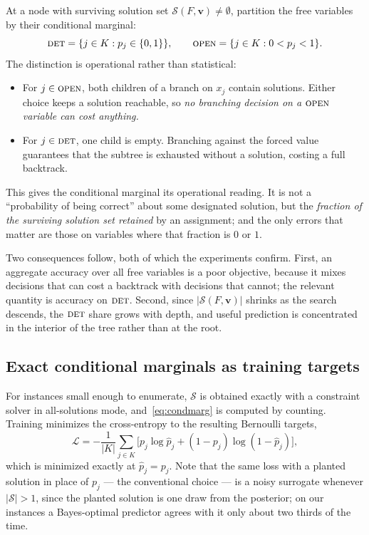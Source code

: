 \documentclass[11pt]{article}
\newcommand{\SOL}{\mathcal{S}}
\newcommand{\FORCED}{\textsc{det}}
\newcommand{\FREE}{\textsc{open}}
\begin{document}
At a node with surviving solution set $\SOL(F,\mathbf{v})\ne\emptyset$, partition the free variables by their conditional marginal:
\begin{equation}
\FORCED = \{j\in K : p_j\in\{0,1\}\},
\qquad
\FREE = \{j\in K : 0<p_j<1\}.
\end{equation}
The distinction is operational rather than statistical:

\begin{itemize}
\item For $j\in\FREE$, both children of a branch on $x_j$ contain solutions. Either choice keeps a solution reachable, so \emph{no branching decision on a $\FREE$ variable can cost anything.}
\item For $j\in\FORCED$, one child is empty. Branching against the forced value guarantees that the subtree is exhausted without a solution, costing a full backtrack.
\end{itemize}

This gives the conditional marginal its operational reading. It is not a ``probability of being correct'' about some designated solution, but the \emph{fraction of the surviving solution set retained} by an assignment; and the only errors that matter are those on variables where that fraction is $0$ or $1$.

Two consequences follow, both of which the experiments confirm. First, an aggregate accuracy over all free variables is a poor objective, because it mixes decisions that can cost a backtrack with decisions that cannot; the relevant quantity is accuracy on $\FORCED$. Second, since $|\SOL(F,\mathbf{v})|$ shrinks as the search descends, the $\FORCED$ share grows with depth, and useful prediction is concentrated in the interior of the tree rather than at the root.

\subsection{Exact conditional marginals as training targets}
\label{sec:method-labels}

For instances small enough to enumerate, $\SOL$ is obtained exactly with a constraint solver in all-solutions mode, and~\eqref{eq:condmarg} is computed by counting. Training minimizes the cross-entropy to the resulting Bernoulli targets,
\begin{equation}
\mathcal{L} = -\frac{1}{|K|}\sum_{j\in K}\Big[p_j\log\hat{p}_j + (1-p_j)\log(1-\hat{p}_j)\Big],
\label{eq:loss}
\end{equation}
which is minimized exactly at $\hat{p}_j = p_j$. Note that the same loss with a planted solution in place of $p_j$ --- the conventional choice --- is a noisy surrogate whenever $|\SOL|>1$, since the planted solution is one draw from the posterior; on our instances a Bayes-optimal predictor agrees with it only about two thirds of the time.
\end{document}
